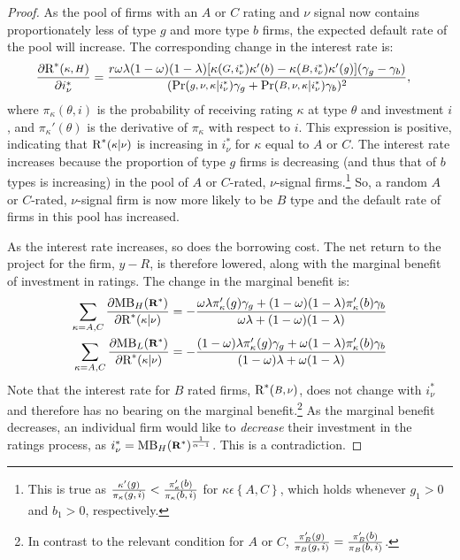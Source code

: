 \documentclass[notitlepage]{article}
\begin{document}
\begin{proof}
As the pool of firms with an $A$ or $C$ rating and $\nu$ signal now contains proportionately less of type $g$ and more type $b$ firms, the expected default rate of the pool will increase. The corresponding change in the interest rate is:
\begin{align}
\frac{\partial \textup{R}^{*}(\medmath{\kappa,H})}{\partial i^{*}_{\nu}} &= 
\frac{r\omega\lambda(1-\omega)(1-\lambda)[\kappa(\medmath{G,i^{*}_{\nu}})\kappa' (\medmath{b})-\kappa (\medmath{B,i^{*}_{\nu}})\kappa' (\medmath{g})](\gamma_{g}-\gamma_{b})}{(\textup{Pr}(\medmath{g,\nu,\kappa}|\medmath{i^{*}_{\nu}})\gamma_g + \textup{Pr}(\medmath{B,\nu,\kappa}|\medmath{i^{*}_{\nu}})\gamma_b)^2},
\end{align}
where $\pi_{\kappa}(\theta,i)$ is the probability of receiving rating $\kappa$ at type $\theta$ and investment $i$, and $\pi_{\kappa}'(\theta)$ is the derivative of $\pi_{\kappa}$ with respect to $i$. This expression is positive, indicating that $\textup{R}^{*}(\medmath{\kappa}|\medmath{\nu})$ is increasing in $i^{*}_{\nu}$ for $\kappa$ equal to $A$ or $C$. The interest rate increases because the proportion of type $g$ firms is decreasing (and thus that of $b$ types is increasing) in the pool of $A$ or $C$-rated, $\nu$-signal firms.\footnote{This is true as $\frac{\kappa'(\medmath{g})}{\pi_{\kappa}(\medmath{g,i})}<\frac{\pi_{\kappa}'(\medmath{b})}{\pi_{\kappa}(\medmath{b,i})}$ for $\kappa\epsilon\left\{A,C\right\}$, which holds whenever $g_{1}>0$ and $b_{1}>0$, respectively.} So, a random $A$ or $C$-rated, $\nu$-signal firm is now more likely to be $B$ type and the default rate of firms in this pool has increased.

As the interest rate increases, so does the borrowing cost. The net return to the project for the firm, $y-R$, is therefore lowered, along with the marginal benefit of investment in ratings. The change in the marginal benefit is:
\begin{align}
\sum_{\kappa = A,C}\frac{\partial \textup{MB}_{H}(\medmath{\mathbf{R^{*}}})}{\partial \textup{R}^{*}(\medmath{\kappa}|\medmath{\nu})} &= -\frac{\omega\lambda\pi_{\kappa}'(g)\gamma_{g}+(1-\omega)(1-\lambda)\pi_{\kappa}'(b)\gamma_b}{\omega\lambda + (1-\omega)(1-\lambda)}\\
\sum_{\kappa = A,C}\frac{\partial \textup{MB}_{L}(\medmath{\mathbf{R^{*}}})}{\partial \textup{R}^{*}(\medmath{\kappa}|\medmath{\nu})} &= -\frac{(1-\omega)\lambda\pi_{\kappa}'(g)\gamma_{g}+\omega(1-\lambda)\pi_{\kappa}'(b)\gamma_b}{(1-\omega)\lambda + \omega(1-\lambda)}
\end{align}
Note that the interest rate for $B$ rated firms, $\textup{R}^{*}(\medmath{B,\nu})$, does not change with $i^{*}_{\nu}$ and therefore has no bearing on the marginal benefit.\footnote{In contrast to the relevant condition for $A$ or $C$, $\frac{\pi_{B}'(\medmath{g})}{\pi_{B}(\medmath{g,i})}=\frac{\pi_{B}'(\medmath{b})}{\pi_{B}(\medmath{b,i})}$.} As the marginal benefit decreases, an individual firm would like to \emph{decrease} their investment in the ratings process, as $i^{*}_{\nu}=\textup{MB}_{H}(\medmath{\mathbf{R^{*}}})^{\frac{1}{\alpha-1}}$. This is a contradiction.
\end{proof}
\end{document}
